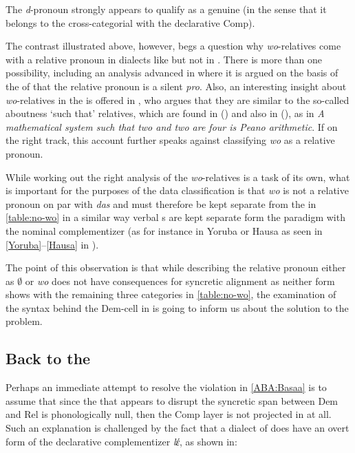The \textit{d}-pronoun strongly appears to qualify as a genuine  (in the sense that it belongs to the cross-categorial  with the declarative Comp).
\par
The contrast illustrated above, however, begs a question why \textit{wo}-relatives come with a relative pronoun in dialects like  but not in . 
There is more than one possibility, including an analysis advanced in \citet{PennerBader1995} where it is argued on the basis of the  of  that the relative pronoun is a silent \textit{pro}. Also, an interesting insight about \textit{wo}-relatives in the  is offered in \citet{vanR2003}, who argues that they are similar to the so-called aboutness `such that' relatives, which are found in  (\citealt[257]{Kuno1973}) and also in  (\citealt[157]{Grosu2002}), as in \textit{A mathematical system such that two and two are four is Peano arithmetic}. If on the right track, this account further speaks against classifying \textit{wo} as a relative pronoun.
\par
While working out the right analysis of the \textit{wo}-relatives is a task of its own, what is important for the purposes of the data classification is that \textit{wo} is not a relative pronoun on par with \textit{das} and must therefore be kept separate from the  in \ref{table:no-wo} in a similar way verbal s are kept separate form the paradigm with the nominal complementizer (as for instance in Yoruba or Hausa as seen in \ref{Yoruba}--\ref{Hausa} in ).
\par
The point of this observation is that while describing the  relative pronoun either as $\emptyset$ or \textit{wo} does not have consequences for syncretic alignment as neither form shows  with the remaining three categories in \ref{table:no-wo}, the examination of the syntax behind the Dem-cell in  is going to inform us about the solution to the  problem. 

\subsection{Back to the  } 

Perhaps an immediate attempt to resolve the  violation in \ref{ABA:Basaa} is to assume that since the  that appears to disrupt the syncretic span between Dem and Rel is phonologically null, then the Comp layer is not projected in  at all. Such an explanation is challenged by the fact that a dialect of  does have an overt form of the declarative complementizer \textit{lέ}, as shown in: 

